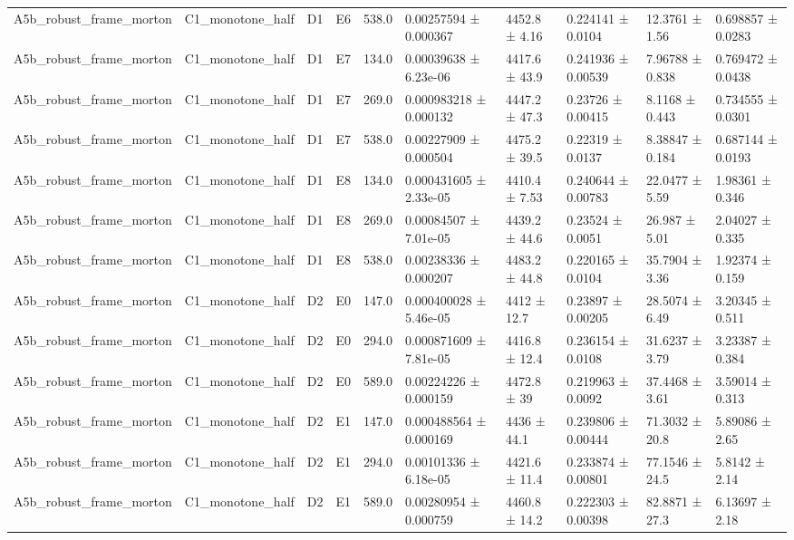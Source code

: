 \begin{table}
\begin{tabular}{llllllllll}
A5b\_robust\_frame\_morton & C1\_monotone\_half & D1 & E6 & 538.0 & 0.00257594 ± 0.000367 & 4452.8 ± 4.16 & 0.224141 ± 0.0104 & 12.3761 ± 1.56 & 0.698857 ± 0.0283 \\
A5b\_robust\_frame\_morton & C1\_monotone\_half & D1 & E7 & 134.0 & 0.00039638 ± 6.23e-06 & 4417.6 ± 43.9 & 0.241936 ± 0.00539 & 7.96788 ± 0.838 & 0.769472 ± 0.0438 \\
A5b\_robust\_frame\_morton & C1\_monotone\_half & D1 & E7 & 269.0 & 0.000983218 ± 0.000132 & 4447.2 ± 47.3 & 0.23726 ± 0.00415 & 8.1168 ± 0.443 & 0.734555 ± 0.0301 \\
A5b\_robust\_frame\_morton & C1\_monotone\_half & D1 & E7 & 538.0 & 0.00227909 ± 0.000504 & 4475.2 ± 39.5 & 0.22319 ± 0.0137 & 8.38847 ± 0.184 & 0.687144 ± 0.0193 \\
A5b\_robust\_frame\_morton & C1\_monotone\_half & D1 & E8 & 134.0 & 0.000431605 ± 2.33e-05 & 4410.4 ± 7.53 & 0.240644 ± 0.00783 & 22.0477 ± 5.59 & 1.98361 ± 0.346 \\
A5b\_robust\_frame\_morton & C1\_monotone\_half & D1 & E8 & 269.0 & 0.00084507 ± 7.01e-05 & 4439.2 ± 44.6 & 0.23524 ± 0.0051 & 26.987 ± 5.01 & 2.04027 ± 0.335 \\
A5b\_robust\_frame\_morton & C1\_monotone\_half & D1 & E8 & 538.0 & 0.00238336 ± 0.000207 & 4483.2 ± 44.8 & 0.220165 ± 0.0104 & 35.7904 ± 3.36 & 1.92374 ± 0.159 \\
A5b\_robust\_frame\_morton & C1\_monotone\_half & D2 & E0 & 147.0 & 0.000400028 ± 5.46e-05 & 4412 ± 12.7 & 0.23897 ± 0.00205 & 28.5074 ± 6.49 & 3.20345 ± 0.511 \\
A5b\_robust\_frame\_morton & C1\_monotone\_half & D2 & E0 & 294.0 & 0.000871609 ± 7.81e-05 & 4416.8 ± 12.4 & 0.236154 ± 0.0108 & 31.6237 ± 3.79 & 3.23387 ± 0.384 \\
A5b\_robust\_frame\_morton & C1\_monotone\_half & D2 & E0 & 589.0 & 0.00224226 ± 0.000159 & 4472.8 ± 39 & 0.219963 ± 0.0092 & 37.4468 ± 3.61 & 3.59014 ± 0.313 \\
A5b\_robust\_frame\_morton & C1\_monotone\_half & D2 & E1 & 147.0 & 0.000488564 ± 0.000169 & 4436 ± 44.1 & 0.239806 ± 0.00444 & 71.3032 ± 20.8 & 5.89086 ± 2.65 \\
A5b\_robust\_frame\_morton & C1\_monotone\_half & D2 & E1 & 294.0 & 0.00101336 ± 6.18e-05 & 4421.6 ± 11.4 & 0.233874 ± 0.00801 & 77.1546 ± 24.5 & 5.8142 ± 2.14 \\
A5b\_robust\_frame\_morton & C1\_monotone\_half & D2 & E1 & 589.0 & 0.00280954 ± 0.000759 & 4460.8 ± 14.2 & 0.222303 ± 0.00398 & 82.8871 ± 27.3 & 6.13697 ± 2.18 \\

\end{tabular}
\end{table}
